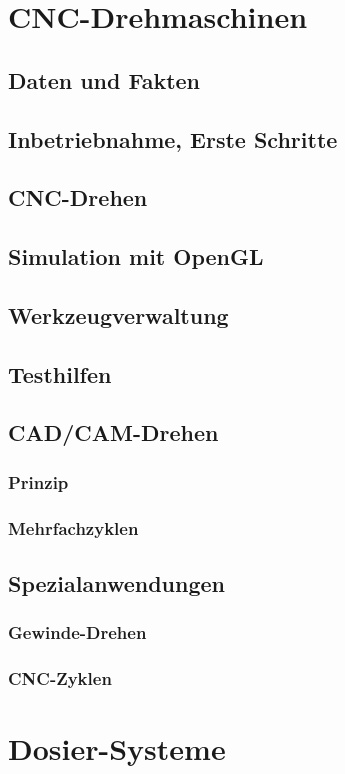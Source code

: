 \documentclass[a5paper]{book}
\begin{document}
\chapter{CNC-Drehmaschinen}
	\section{Daten und Fakten} 
	\section{Inbetriebnahme, Erste Schritte} 
	\section{CNC-Drehen} 
	\section{Simulation mit OpenGL} 
	\section{Werkzeugverwaltung} 
	\section{Testhilfen} 
	\section{CAD/CAM-Drehen} 
		\subsection{Prinzip} 
		\subsection{Mehrfachzyklen} 
	\section{Spezialanwendungen} 
		\subsection{Gewinde-Drehen} 
		\subsection{CNC-Zyklen} 
 
\chapter{Dosier-Systeme}
\end{document}

